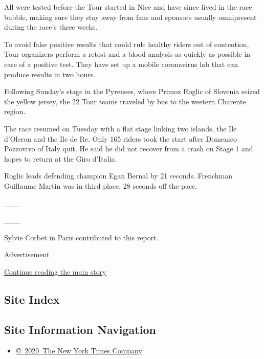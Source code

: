 All were tested before the Tour started in Nice and have since lived in
the race bubble, making sure they stay away from fans and sponsors
usually omnipresent during the race's three weeks.

To avoid false positive results that could rule healthy riders out of
contention, Tour organizers perform a retest and a blood analysis as
quickly as possible in case of a positive test. They have set up a
mobile coronavirus lab that can produce results in two hours.

Following Sunday's stage in the Pyrenees, where Primoz Roglic of
Slovenia seized the yellow jersey, the 22 Tour teams traveled by bus to
the western Charente region.

The race resumed on Tuesday with a flat stage linking two islands, the
Ile d'Oleron and the Ile de Re. Only 165 riders took the start after
Domenico Pozzovivo of Italy quit. He said he did not recover from a
crash on Stage 1 and hopes to return at the Giro d'Italia.

Roglic leads defending champion Egan Bernal by 21 seconds. Frenchman
Guillaume Martin was in third place, 28 seconds off the pace.

\_\_\_

\_\_\_

Sylvie Corbet in Paris contributed to this report.

Advertisement

\protect\hyperlink{after-bottom}{Continue reading the main story}

\hypertarget{site-index}{%
\subsection{Site Index}\label{site-index}}

\hypertarget{site-information-navigation}{%
\subsection{Site Information
Navigation}\label{site-information-navigation}}

\begin{itemize}
\tightlist
\item
  \href{https://help.nytimes3xbfgragh.onion/hc/en-us/articles/115014792127-Copyright-notice}{©~2020~The
  New York Times Company}
\end{itemize}

